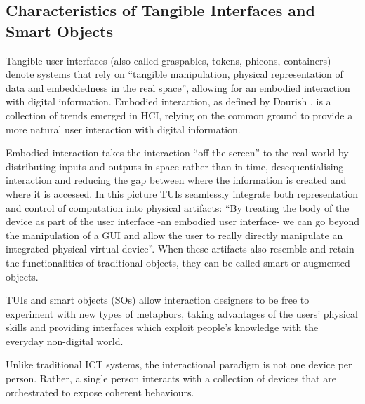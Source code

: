 \subsection{Characteristics of Tangible Interfaces and Smart Objects}
Tangible user interfaces (also called graspables, tokens, phicons, containers) denote systems that rely on ``tangible manipulation, physical representation of data and embeddedness in the real space'', allowing for an embodied interaction with digital information. Embodied interaction, as defined by Dourish \cite{dourish_where_2004}, is a collection of trends emerged in HCI, relying on the common ground to provide a more natural user interaction with digital information.

Embodied interaction takes the interaction ``off the screen'' to the real world by distributing inputs and outputs in space rather than in time, desequentialising interaction and reducing the gap between where the information is created and where it is accessed. In this picture TUIs seamlessly integrate both representation and control of computation into physical artifacts: ``By treating the body of the device as part of the user interface -an embodied user interface- we can go beyond the manipulation of a GUI and allow the user to really directly manipulate an integrated physical-virtual device''.
When these artifacts also resemble and retain the functionalities of traditional objects, they can be called smart or augmented objects.

TUIs and smart objects (SOs) allow interaction designers to be free to experiment with new types of metaphors, taking advantages of the users' physical skills and providing interfaces which exploit people's knowledge with the everyday non-digital world.

Unlike traditional ICT systems, the interactional paradigm is not one device per person. Rather, a single person interacts with a collection of devices that are orchestrated to expose coherent behaviours.
